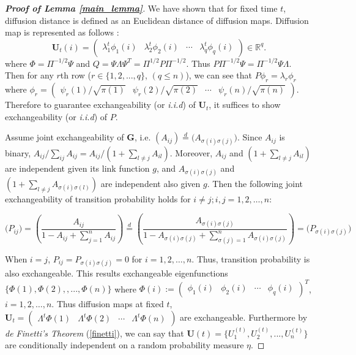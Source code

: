 \documentclass[12pt]{article}
\theoremstyle{definition}
\begin{document}
\begin{proof}[\textbf{Proof of Lemma \ref{main_lemma}}]
We have shown that for fixed time $t$, diffusion distance is defined as an Euclidean distance of diffusion maps. Diffusion map is represented as follows :
\begin{equation}
	\boldsymbol{U}_{t}(i) = \begin{pmatrix} \lambda^{t}_{1} \phi_{1}(i) & \lambda^{t}_{2} \phi_{2} (i)  & \cdots & \lambda^{t}_{q} \phi_{q}(i) \end{pmatrix} \in \mathbb{R}^{q}.
\end{equation}
where $\Phi = \Pi^{-1/2}\Psi$ and $Q= \Psi \Lambda \Psi^{T} = \Pi^{1/2} P \Pi^{-1/2}$. 
Thus $P \Pi^{-1/2} \Psi = \Pi^{-1/2} \Psi \Lambda$. 
Then for any $r$th row ($r \in \{1,2, ... , q \}$, $(q \leq n)$), we can see that $P \phi_{r} = \lambda_{r} \phi_{r}$  where $\phi_{r} = \begin{pmatrix}  \psi_{r}(1) / \sqrt{\pi(1)} &  \psi_{r}(2) /  \sqrt{\pi(2)} & \cdots & \psi_{r}(n) /  \sqrt{\pi(n)}  \end{pmatrix}$.
Therefore to guarantee exchangeability (or \textit{i.i.d}) of $\mathbf{U}_{t}$, it suffices to show exchangeability (or \textit{i.i.d}) of $P$.

Assume joint exchangeability of $\mathbf{G}$, i.e. $(A_{ij}) \stackrel{d}{=} \big( A_{\sigma(i) \sigma(j)} \big)$. 
Since $A_{ij}$ is binary, $A_{ij} / \sum\limits_{ij} A_{ij} = A_{ij} /  (1 + \sum\limits_{l \neq j} A_{il})$. Moreover, $A_{ij}$ and $(1 + \sum\limits_{l \neq j} A_{il})$ are independent given its link function $g$, and $A_{\sigma(i) \sigma(j)}$ and $(1 + \sum\limits_{l \neq j} A_{\sigma(i) \sigma(l)})$ are independent also given $g$.
Then the following joint exchangeability of transition probability holds for $i \neq j; i,j = 1,2, \ldots,n$:

\begin{equation}
\big( P_{ij} \big) = \left(  \frac{A_{ij}}{1 - A_{ij} + \sum\limits_{j=1}^{n} A_{ij} } \right)  \stackrel{d}{=} \left( \frac{A_{\sigma(i) \sigma(j)} }{1 - A_{\sigma(i) \sigma(j)} + \sum\limits_{\sigma(j) = 1}^{n} A_{\sigma(i) \sigma(j)} } \right) = \big( P_{\sigma(i) \sigma(j)} \big)
\end{equation}
		
When $i = j$, $P_{ij} = P_{\sigma(i) \sigma(j)} = 0$ for $i=1,2, \ldots, n$.
Thus, transition probability is also exchangeable. 
This results exchangeable eigenfunctions $\{ \Phi(1), \Phi(2), , ... , \Phi(n) \}$ 
where $\Phi(i) := \begin{pmatrix} \phi_{1}(i) & \phi_{2}(i) & \cdots & \phi_{q}(i) \end{pmatrix}^{T}$, $i=1,2, \ldots, n$. Thus diffusion maps at fixed $t$, $\mathbf{U}_{t} = \begin{pmatrix} \Lambda^{t} \Phi(1)  & \Lambda^{t} \Phi(2) & \cdots & \Lambda^{t} \Phi(n)  \end{pmatrix}$ are exchangeable.  Furthermore by \textit{de Finetti's Theorem} (\ref{finetti}), we can say that $\mathbf{U}(t) = \{ U^{(t)}_{1}, U^{(t)}_{2}, ... , U^{(t)}_{n} \}$ are conditionally independent on a random probability measure $\eta$. 
\end{proof}
	
\end{document}
